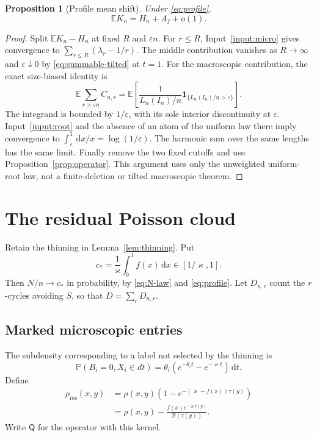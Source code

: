 \documentclass[11pt]{article}
\numberwithin{equation}{section}
\newtheorem{proposition}[theorem]{Proposition}
\theoremstyle{definition}
\theoremstyle{remark}
\newcommand{\E}{\mathbb E}
\newcommand{\Pp}{\mathbb P}
\newcommand{\one}{\mathbf 1}
\newcommand{\dd}{\,\mathrm d}
\newcommand{\cB}{\mathcal B}
\newcommand{\Qop}{\mathsf Q}
\newcommand{\eps}{\varepsilon}
\begin{document}
\begin{proposition}[Profile mean shift]\label{prop:mean-profile}
Under \eqref{eq:profile},
\begin{equation}\label{eq:mean-profile}
 \E K_n=H_n+A_f+o(1).
\end{equation}
\end{proposition}
\begin{proof}
Split $\E K_n-H_n$ at fixed $R$ and $\eps n$. For $r\le R$, Input~\ref{input:micro} gives convergence to $\sum_{r\le R}(\lambda_r-1/r)$. The middle contribution vanishes as $R\to\infty$ and $\eps\downarrow0$ by \eqref{eq:summable-tilted} at $t=1$.
For the macroscopic contribution, the exact size-biased identity is
\[
 \E\sum_{r>\eps n}C_{n,r}
 =\E\left[\frac{1}{L_n(I_n)/n}\one_{\{L_n(I_n)/n>\eps\}}\right].
\]
The integrand is bounded by $1/\eps$, with its sole interior discontinuity at $\eps$. Input~\ref{input:root} and the absence of an atom of the uniform law there imply convergence to $\int_\eps^1\dd x/x=\log(1/\eps)$. The harmonic sum over the same lengths has the same limit. Finally remove the two fixed cutoffs and use Proposition~\ref{prop:operator}. This argument uses only the unweighted uniform-root law, not a finite-deletion or tilted macroscopic theorem.
\end{proof}

\section{The residual Poisson cloud}\label{sec:marked}

Retain the thinning in Lemma~\ref{lem:thinning}. Put
\begin{equation}\label{eq:retention-mean}
 c_* =\frac1\varkappa\int_0^1f(x)\dd x\in[1/\varkappa,1].
\end{equation}
Then $N/n\to c_*$ in probability, by \eqref{eq:N-law} and \eqref{eq:profile}. Let $D_{n,r}$ count the $r$-cycles avoiding $S$, so that $D=\sum_r D_{n,r}$.

\subsection{Marked microscopic entries}
The subdensity corresponding to a label not selected by the thinning is
\begin{equation}\label{eq:unselected-density}
 \Pp(B_i=0,X_i\in dt)
 =\theta_i\left(e^{-\theta_i t}-e^{-\varkappa t}\right)\dd t.
\end{equation}
Define
\begin{align}
 \rho_{\mathrm{res}}(x,y)
 &=\rho(x,y)\left(1-e^{-(\varkappa-f(x))\tau(y)}\right)\label{eq:residual-kernel}\\
 &=\rho(x,y)-\frac{f(x)e^{-\varkappa\tau(y)}}{\cB(\tau(y))}.
 \nonumber
\end{align}
Write $\Qop$ for the operator with this kernel.
\end{document}
